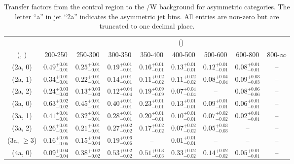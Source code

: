 \begin{table}[h!]
\tiny
\centering
\caption{Transfer factors from the \mj control region to the \ttbar/W background for asymmetric categories. The letter ``a'' in jet \eg ``2a''  indicates the asymmetric jet bins. All entries are non-zero but are truncated to one decimal place.\label{tab:tf_mu_ttw_asym}}
\begin{tabular}
{ccccccccc}
	\hline\hline
&	& \multicolumn{8}{c}{\scalht (\gev)} \\ 
	 (\njet,  \nb) & 200-250 & 250-300 & 300-350 & 350-400 & 400-500 & 500-600 & 600-800 & 800-$\infty$ \\ [0.8ex] 
\hline
	(2a, 0) & $0.49^{+ 0.01 }_{- 0.01 }$ & $0.25^{+ 0.01 }_{- 0.01 }$ & $0.19^{+ 0.01 }_{- 0.01 }$ & $0.16^{+ 0.01 }_{- 0.01 }$ & $0.13^{+ 0.01 }_{- 0.01 }$ & $0.12^{+ 0.01 }_{- 0.01 }$ & $0.08^{+ 0.01 }_{- 0.01 }$ & -- \\[0.5ex] 
	(2a, 1) & $0.34^{+ 0.01 }_{- 0.01 }$ & $0.22^{+ 0.01 }_{- 0.01 }$ & $0.14^{+ 0.01 }_{- 0.01 }$ & $0.11^{+ 0.02 }_{- 0.02 }$ & $0.11^{+ 0.02 }_{- 0.02 }$ & $0.08^{+ 0.04 }_{- 0.04 }$ & $0.09^{+ 0.03 }_{- 0.03 }$ & -- \\[0.5ex] 
	(2a, 2) & $0.24^{+ 0.03 }_{- 0.03 }$ & $0.13^{+ 0.03 }_{- 0.03 }$ & $0.12^{+ 0.04 }_{- 0.04 }$ & $0.19^{+ 0.09 }_{- 0.09 }$ & $0.07^{+ 0.04 }_{- 0.04 }$ & -- & $0.08^{+ 0.06 }_{- 0.06 }$ & -- \\[0.5ex] 
	(3a, 0) & $0.63^{+ 0.02 }_{- 0.02 }$ & $0.45^{+ 0.01 }_{- 0.01 }$ & $0.40^{+ 0.01 }_{- 0.01 }$ & $0.23^{+ 0.01 }_{- 0.01 }$ & $0.13^{+ 0.01 }_{- 0.01 }$ & $0.09^{+ 0.01 }_{- 0.01 }$ & $0.06^{+ 0.01 }_{- 0.01 }$ & -- \\[0.5ex] 
	(3a, 1) & $0.41^{+ 0.01 }_{- 0.01 }$ & $0.32^{+ 0.01 }_{- 0.01 }$ & $0.28^{+ 0.01 }_{- 0.01 }$ & $0.20^{+ 0.01 }_{- 0.01 }$ & $0.10^{+ 0.01 }_{- 0.01 }$ & $0.07^{+ 0.02 }_{- 0.02 }$ & $0.02^{+ 0.01 }_{- 0.01 }$ & -- \\[0.5ex] 
	(3a, 2) & $0.26^{+ 0.01 }_{- 0.01 }$ & $0.21^{+ 0.01 }_{- 0.01 }$ & $0.27^{+ 0.02 }_{- 0.02 }$ & $0.17^{+ 0.02 }_{- 0.02 }$ & $0.07^{+ 0.02 }_{- 0.02 }$ & $0.05^{+ 0.03 }_{- 0.03 }$ & -- & -- \\[0.5ex] 
	(3a, $\ge3$) & $0.16^{+ 0.05 }_{- 0.05 }$ & $0.15^{+ 0.04 }_{- 0.04 }$ & $0.19^{+ 0.06 }_{- 0.06 }$ & -- & $0.01^{+ 0.01 }_{- 0.01 }$ & -- & -- & -- \\[0.5ex] 
	(4a, 0) & $0.09^{+ 0.04 }_{- 0.04 }$ & $0.38^{+ 0.02 }_{- 0.02 }$ & $0.53^{+ 0.02 }_{- 0.02 }$ & $0.51^{+ 0.03 }_{- 0.03 }$ & $0.33^{+ 0.02 }_{- 0.02 }$ & $0.14^{+ 0.02 }_{- 0.02 }$ & $0.05^{+ 0.01 }_{- 0.01 }$ & -- \\[0.5ex] 

\end{tabular}
\end{table}
